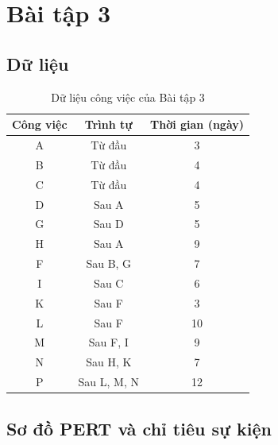 \section{Bài tập 3}

\subsection{Dữ liệu}

\begin{table}[H]\centering
\caption{Dữ liệu công việc của Bài tập 3}
\begin{tabular}{c c c}
\toprule
\textbf{Công việc} & \textbf{Trình tự} & \textbf{Thời gian (ngày)}\\
\midrule
A & Từ đầu & 3\\
B & Từ đầu & 4\\
C & Từ đầu & 4\\
D & Sau A & 5\\
G & Sau D & 5\\
H & Sau A & 9\\
F & Sau B, G & 7\\
I & Sau C & 6\\
K & Sau F & 3\\
L & Sau F & 10\\
M & Sau F, I & 9\\
N & Sau H, K & 7\\
P & Sau L, M, N & 12\\
\bottomrule
\end{tabular}
\end{table}

\subsection{Sơ đồ PERT và chỉ tiêu sự kiện}


